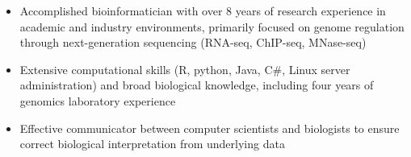 

\begin{resentries}

\vspace{-2mm}

\begin{itemize}[leftmargin=*]
	\setlength{\itemsep}{-1.5mm}
	\item{Accomplished bioinformatician with over 8 years of research experience in academic and industry environments, primarily focused on genome regulation through next-generation sequencing (RNA-seq, ChIP-seq, MNase-seq)}
	\item{Extensive computational skills (R, python, Java, C\#, Linux server administration) and broad biological knowledge, including four years of genomics laboratory experience}
	\item{Effective communicator between computer scientists and biologists to ensure correct biological interpretation from underlying data}

\end{itemize}

\end{resentries}
